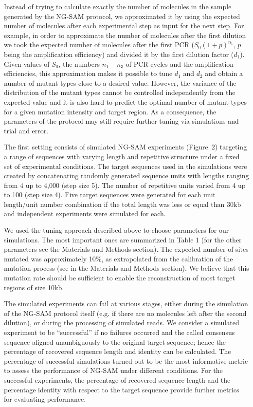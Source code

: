 \documentclass[10pt]{article}
\newcommand{\blue}[1]{{\color{blue} #1}}
\begin{document}
\blue{Instead} of trying to calculate exactly the number of molecules in the sample generated by the NG-SAM protocol, we approximated it by using the expected number of molecules after each experimental step as input for the next step. For example, in order to approximate the number of molecules after the first dilution we took the expected number of molecules after the first PCR ($S_0 (1+p)^{n_1}$, $p$ being the amplification efficiency) and divided it by the first dilution factor ($d_1$). \blue{Given values of $S_0$, the numbers $n_1$ -- $n_3$ of PCR cycles and the amplification efficiencies, this} approximation makes it possible to tune $d_1$ and $d_2$ and obtain a number of mutant types close to a desired value. However, the variance of the distribution of the mutant types cannot be controlled independently from the expected value and it is also hard to predict the optimal number of mutant types for a given mutation intensity and target region. As a consequence, the parameters of the protocol may still require further tuning via simulations and trial and error.

The first setting consists of  simulated NG-SAM experiments (Figure~2) targeting a range of sequences with varying length and repetitive structure under a fixed set of experimental conditions.
The target sequences used in the simulations were created by concatenating randomly generated sequence units with lengths ranging from 4 up to 4,000 (step size 5). The number of repetitive units varied from 4 up to 100 (step size 4). Five target sequences were generated for each unit length/unit number combination if the total length was less or equal than 30kb and independent experiments were simulated for each.


We used the tuning approach described above to choose parameters for our simulations. The most important ones are summarized in Table 1 (for the other parameters see the Materials and Methods section). The expected number of sites mutated was approximately 10\%, as extrapolated from the calibration of the mutation process (see in the Materials and Methods section). We believe that this mutation rate should be sufficient to enable the reconstruction of most target regions of size 10kb.

The simulated experiments can fail at various stages, either during the simulation of the NG-SAM protocol itself (e.g. if there are no molecules left after the second dilution), or during the processing of simulated reads. We consider a simulated experiment to be ``successful'' if no failures occurred and the called consensus sequence aligned unambiguously to the original target sequence; hence the percentage of recovered sequence length and identity can be calculated. The \blue{percentage} of successful simulations turned out to be the most informative metric to assess the performance of NG-SAM under different conditions. For the successful experiments, the percentage of recovered sequence length and the \blue{percentage} identity with respect to the target sequence provide further metrics for evaluating performance.
\end{document}
